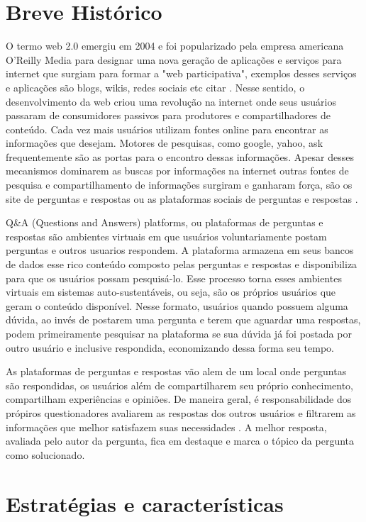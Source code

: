 \section{Breve Histórico}%

O termo web 2.0 emergiu em 2004 e foi popularizado pela empresa americana O'Reilly Media para designar uma nova geração de aplicações e serviços para internet
 que surgiam para formar a "web participativa", exemplos desses serviços e aplicações são  blogs, wikis, redes sociais etc citar \cite{madden2006riding}.  Nesse sentido,
 o desenvolvimento da web criou uma revolução na internet onde  seus usuários passaram de consumidores passivos  para produtores e compartilhadores de conteúdo. 
Cada vez mais usuários utilizam fontes online para encontrar as informações que desejam. Motores de pesquisas, como google, yahoo, ask frequentemente são as portas
 para o encontro dessas informações. Apesar desses mecanismos dominarem as buscas por informações na internet outras fontes de pesquisa e compartilhamento de informações
 surgiram e ganharam força, são os site de perguntas e respostas ou as plataformas sociais de perguntas e respostas \cite{shah2008explorin}.

Q\&A (Questions and Answers) platforms, ou plataformas de perguntas e respostas são ambientes virtuais em que usuários voluntariamente postam perguntas e outros usuarios respondem.
 A plataforma armazena em seus bancos de dados esse rico conteúdo composto pelas perguntas e respostas e disponibiliza para que os usuários possam pesquisá-lo. Esse processo torna
 esses ambientes virtuais em sistemas auto-sustentáveis, ou seja, são os próprios usuários que geram o conteúdo disponível. Nesse formato, usuários quando possuem alguma dúvida, 
 ao invés de postarem uma pergunta e terem que aguardar uma respostas, podem primeiramente pesquisar na plataforma se sua dúvida já foi postada por outro usuário e inclusive respondida,
 economizando dessa forma seu tempo.
 
As plataformas de perguntas e respostas vão alem de um local onde perguntas são respondidas, os usuários além de compartilharem seu próprio conhecimento, compartilham experiências e opiniões. De maneira geral, é responsabilidade dos própiros questionadores avaliarem as respostas dos outros usuários e filtrarem as informações que melhor satisfazem suas necessidades \cite{kim2007best}. 
 A melhor resposta, avaliada pelo autor da pergunta, fica em destaque e marca o tópico da pergunta como solucionado.

\section{Estratégias e características}%

